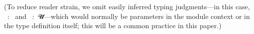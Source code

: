 \begin{code}
\AgdaSpace{}%
\AgdaSpace{}%
\AgdaSpace{}%
\<%
\\
%
\>[1]\AgdaSpace{}%
\AgdaSpace{}%
\AgdaSymbol{=}\AgdaSpace{}%
\<%
\\
%
\\[\AgdaEmptyExtraSkip]%
%
\>[1]\AgdaSpace{}%
\AgdaSymbol{:}\AgdaSpace{}%
\AgdaSymbol{(}\AgdaSpace{}%
\AgdaSpace{}%
\AgdaSpace{}%
\AgdaSymbol{:}\AgdaSpace{}%
\AgdaSymbol{)}\AgdaSpace{}%
\AgdaSpace{}%
\AgdaSpace{}%
\AgdaSpace{}%
\AgdaSpace{}%
\AgdaSpace{}%
\AgdaSpace{}%
\AgdaSpace{}%
\AgdaSpace{}%
\AgdaSpace{}%
\AgdaSpace{}%
\AgdaSpace{}%
\<%
\\
%
\>[1]\AgdaSpace{}%
\AgdaSymbol{\AgdaUnderscore{}}\AgdaSpace{}%
\AgdaSymbol{\AgdaUnderscore{}}\AgdaSpace{}%
\AgdaSymbol{\AgdaUnderscore{}}\AgdaSpace{}%
\AgdaSpace{}%
\AgdaSpace{}%
\AgdaSymbol{=}\AgdaSpace{}%
\<%
\\
%
\\[\AgdaEmptyExtraSkip]%
%
\>[1]\AgdaSpace{}%
\AgdaSymbol{:}\AgdaSpace{}%
\AgdaSymbol{\{}\AgdaSpace{}%
\AgdaSpace{}%
\AgdaSpace{}%
\AgdaSymbol{:}\AgdaSpace{}%
\AgdaSymbol{\}}\AgdaSpace{}%
\AgdaSpace{}%
\AgdaSpace{}%
\AgdaSpace{}%
\AgdaSpace{}%
\AgdaSpace{}%
\AgdaSpace{}%
\AgdaSpace{}%
\AgdaSpace{}%
\AgdaSpace{}%
\AgdaSpace{}%
\AgdaSpace{}%
\<%
\\
%
\>[1]\AgdaSpace{}%
\AgdaSpace{}%
\AgdaSpace{}%
\AgdaSymbol{=}\AgdaSpace{}%
\<%
\end{code}
\ccpad
(To reduce reader strain, we omit easily inferred typing judgments---in this case, ~\as :~ and ~\as :~\ab 𝓤\af ̇---which would normally be parameters in the module context or in the type definition itself; this will be a common practice in this paper.)

